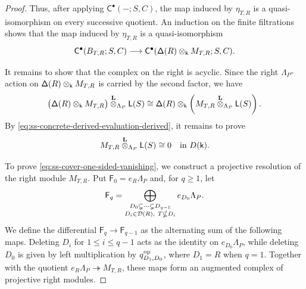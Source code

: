 \begin{proof}
Thus, after applying $\mathsf C^\bullet(-;S,C)$, the map induced by
$\eta_{T,R}$ is a quasi-isomorphism on every successive quotient.
An induction on the finite filtrations shows that the map induced by
$\eta_{T,R}$ is a quasi-isomorphism
\begin{equation}
\label{eq:ss-cover-derived-evaluation-comparison}
\mathsf C^\bullet(B_{T,R};S,C)
\longrightarrow
\mathsf C^\bullet(\mathsf\Delta(R)\otimes_{\mathsf{k}} M_{T,R};S,C).
\end{equation}


It remains to show that the complex on the right is acyclic.
Since the right $\Lambda_P$-action on
$\mathsf\Delta(R)\otimes_{\mathsf{k}} M_{T,R}$ is carried by the second factor, we have
\[
\bigl(\mathsf\Delta(R)\otimes_{\mathsf{k}} M_{T,R}\bigr)
\overset{\mathbf L}{\otimes}_{\Lambda_P}\mathsf L(S)
\cong
\mathsf\Delta(R)\otimes_{\mathsf{k}}
\left(
M_{T,R}
\overset{\mathbf L}{\otimes}_{\Lambda_P}\mathsf L(S)
\right).
\]
By \eqref{eq:ss-concrete-derived-evaluation-derived}, it remains to prove
\begin{equation}
\label{eq:ss-cover-one-sided-vanishing}
M_{T,R}
\overset{\mathbf L}{\otimes}_{\Lambda_P}\mathsf L(S)
\cong0
\quad\text{in }D(\mathsf{k}).
\end{equation}



To prove \eqref{eq:ss-cover-one-sided-vanishing}, we construct a projective resolution of the right module $M_{T,R}$.
Put $\mathsf F_0=e_R\Lambda_P$ and, for $q\geq1$, let
\[
\mathsf F_q
=
\bigoplus_{\substack{
D_0\subsetneq\cdots\subsetneq D_{q-1}\\
D_i\in\mathcal D(R),\ T\nsubseteq D_i}}
e_{D_0}\Lambda_P.
\]
We define the differential
$\mathsf F_q\to\mathsf F_{q-1}$ as the alternating sum of the
following maps.  Deleting $D_i$ for $1\leq i\leq q-1$ acts as the
identity on $e_{D_0}\Lambda_P$, while deleting $D_0$ is given by left
multiplication by $q_{D_1,D_0}^{\mathrm{op}}$, where $D_1=R$ when $q=1$.
Together with the quotient
$e_R\Lambda_P\twoheadrightarrow M_{T,R}$, these maps form an
augmented complex of projective right modules.


\end{proof}
